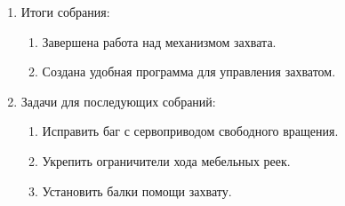 \begin{enumerate}
\begin{enumerate}
    \end{enumerate}
    
	\item Итоги собрания: 
	\begin{enumerate}
	  \item Завершена работа над механизмом захвата.
	  
      \item Создана удобная программа для управления захватом.
      
    \end{enumerate}
    
	\item Задачи для последующих собраний:
	\begin{enumerate}
	  \item Исправить баг с сервоприводом свободного вращения.
	  
	  \item Укрепить ограничители хода мебельных реек.
	  
	  \item Установить балки помощи захвату.

    \end{enumerate}     
\end{enumerate}

\fillpage
